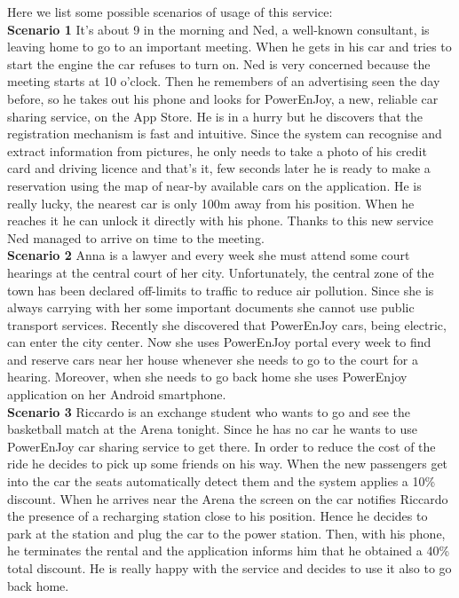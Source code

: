 Here we list some possible scenarios of usage of this service:\\
\bigbreak
\bigbreak
\textbf{\large Scenario 1}
\bigbreak
It's about 9 in the morning and Ned, a well-known consultant, is leaving home to go to an important meeting. When he gets in his car and tries to start the engine the car refuses to turn on. Ned is very concerned because the meeting starts at 10 o'clock. Then he remembers of an advertising seen the day before, so he takes out his phone and looks for PowerEnJoy, a new, reliable car sharing service, on the App Store. He is in a hurry but he discovers that the registration mechanism is fast and intuitive. Since the system can recognise and extract information from pictures, he only needs to take a photo of his credit card and driving licence and that's it, few seconds later he is ready to make a reservation using the map of near-by available cars on the application. He is really lucky, the nearest car is only 100m away from his position. When he reaches it he can unlock it directly with his phone. Thanks to this new service Ned managed to arrive on time to the meeting.\\
\bigbreak
\bigbreak
\textbf{\large Scenario 2}
\bigbreak
Anna is a lawyer and every week she must attend some court hearings at the central court of her city. Unfortunately, the central zone of the town has been declared off-limits to traffic to reduce air pollution. Since she is always carrying with her some important documents she cannot use public transport services. Recently she discovered that PowerEnJoy cars, being electric, can enter the city center. Now she uses PowerEnJoy portal every week to find and reserve cars near her house whenever she needs to go to the court for a hearing. Moreover, when she needs to go back home she uses PowerEnjoy application on her Android smartphone. \\
\bigbreak
\bigbreak
\textbf{\large Scenario 3}
\bigbreak
Riccardo is an exchange student who wants to go and see the basketball match at the Arena tonight. Since he has no car he wants to use PowerEnJoy car sharing service to get there. In order to reduce the cost of the ride he decides to pick up some friends on his way. When the new passengers get into the car the seats automatically detect them and the system applies a 10\% discount. When he arrives near the Arena the screen on the car notifies Riccardo the presence of a recharging station close to his position. Hence he decides to park at the station and plug the car to the power station. Then, with his phone, he terminates the rental and the application informs him that he obtained a 40\% total discount. He is really happy with the service and decides to use it also to go back home.\\
